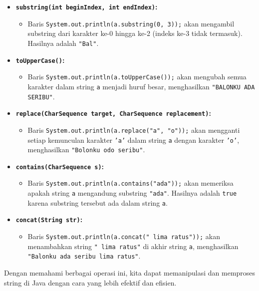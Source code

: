 \begin{itemize}
	\item \textbf{\texttt{substring(int beginIndex, int endIndex)}:} 
	\begin{itemize}
		\item Baris \texttt{System.out.println(a.substring(0, 3));} akan mengambil substring dari karakter ke-0 hingga ke-2 (indeks ke-3 tidak termasuk). Hasilnya adalah \texttt{"Bal"}.
	\end{itemize}
	
	\item \textbf{\texttt{toUpperCase()}:}
	\begin{itemize}
		\item Baris \texttt{System.out.println(a.toUpperCase());} akan mengubah semua karakter dalam string \texttt{a} menjadi huruf besar, menghasilkan \texttt{"BALONKU ADA SERIBU"}.
	\end{itemize}
	
	\item \textbf{\texttt{replace(CharSequence target, CharSequence replacement)}:}
	\begin{itemize}
		\item Baris \texttt{System.out.println(a.replace("a", "o"));} akan mengganti setiap kemunculan karakter \texttt{'a'} dalam string \texttt{a} dengan karakter \texttt{'o'}, menghasilkan \texttt{"Bolonku odo seribu"}.
	\end{itemize}
	
	\item \textbf{\texttt{contains(CharSequence s)}:}
	\begin{itemize}
		\item Baris \texttt{System.out.println(a.contains("ada"));} akan memeriksa apakah string \texttt{a} mengandung substring \texttt{"ada"}. Hasilnya adalah \texttt{true} karena substring tersebut ada dalam string \texttt{a}.
	\end{itemize}
	
	\item \textbf{\texttt{concat(String str)}:}
	\begin{itemize}
		\item Baris \texttt{System.out.println(a.concat(" lima ratus"));} akan menambahkan string \texttt{" lima ratus"} di akhir string \texttt{a}, menghasilkan \texttt{"Balonku ada seribu lima ratus"}.
	\end{itemize}
\end{itemize}

Dengan memahami berbagai operasi ini, kita dapat memanipulasi dan memproses string di Java dengan cara yang lebih efektif dan efisien.

